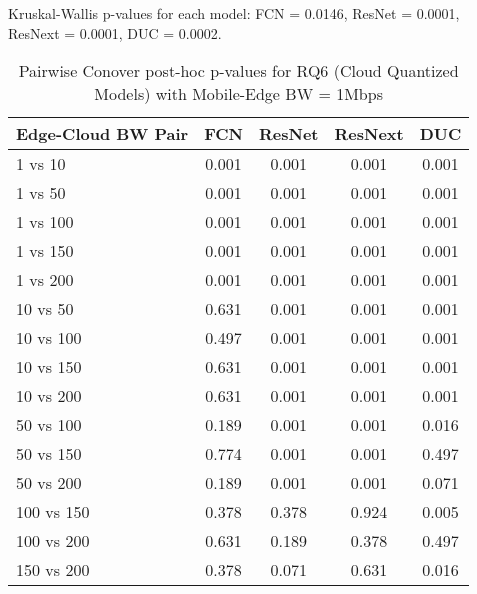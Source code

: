 \begin{table}[h]
\centering
\caption{Pairwise Conover post-hoc p-values for RQ6 (Cloud Quantized Models) with Mobile-Edge BW = 1Mbps}
\label{tab:conover_cloud_quantized_me1}
\smallskip
Kruskal-Wallis p-values for each model: FCN = 0.0146, ResNet = 0.0001, ResNext = 0.0001, DUC = 0.0002.

\begin{tabular}{lcccc}
\toprule
Edge-Cloud BW Pair & FCN & ResNet & ResNext & DUC \\
\midrule
1 vs 10 & 0.001 & 0.001 & 0.001 & 0.001 \\
1 vs 50 & 0.001 & 0.001 & 0.001 & 0.001 \\
1 vs 100 & 0.001 & 0.001 & 0.001 & 0.001 \\
1 vs 150 & 0.001 & 0.001 & 0.001 & 0.001 \\
1 vs 200 & 0.001 & 0.001 & 0.001 & 0.001 \\
10 vs 50 & 0.631 & 0.001 & 0.001 & 0.001 \\
10 vs 100 & 0.497 & 0.001 & 0.001 & 0.001 \\
10 vs 150 & 0.631 & 0.001 & 0.001 & 0.001 \\
10 vs 200 & 0.631 & 0.001 & 0.001 & 0.001 \\
50 vs 100 & 0.189 & 0.001 & 0.001 & 0.016 \\
50 vs 150 & 0.774 & 0.001 & 0.001 & 0.497 \\
50 vs 200 & 0.189 & 0.001 & 0.001 & 0.071 \\
100 vs 150 & 0.378 & 0.378 & 0.924 & 0.005 \\
100 vs 200 & 0.631 & 0.189 & 0.378 & 0.497 \\
150 vs 200 & 0.378 & 0.071 & 0.631 & 0.016 \\
\bottomrule
\end{tabular}
\end{table}

